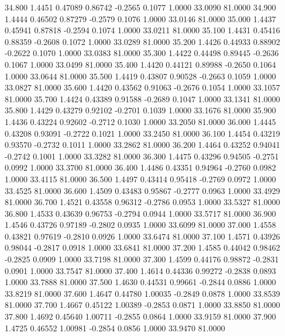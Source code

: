   34.800   1.4451   0.47089   0.86742  -0.2565   0.1077   1.0000  33.0090  81.0000
  34.900   1.4444   0.46502   0.87279  -0.2579   0.1076   1.0000  33.0146  81.0000
  35.000   1.4437   0.45941   0.87818  -0.2594   0.1074   1.0000  33.0211  81.0000
  35.100   1.4431   0.45416   0.88359  -0.2608   0.1072   1.0000  33.0289  81.0000
  35.200   1.4426   0.44933   0.88902  -0.2622   0.1070   1.0000  33.0383  81.0000
  35.300   1.4422   0.44498   0.89445  -0.2636   0.1067   1.0000  33.0499  81.0000
  35.400   1.4420   0.44121   0.89988  -0.2650   0.1064   1.0000  33.0644  81.0000
  35.500   1.4419   0.43807   0.90528  -0.2663   0.1059   1.0000  33.0827  81.0000
  35.600   1.4420   0.43562   0.91063  -0.2676   0.1054   1.0000  33.1057  81.0000
  35.700   1.4424   0.43389   0.91588  -0.2689   0.1047   1.0000  33.1341  81.0000
  35.800   1.4429   0.43279   0.92102  -0.2701   0.1039   1.0000  33.1676  81.0000
  35.900   1.4436   0.43224   0.92602  -0.2712   0.1030   1.0000  33.2050  81.0000
  36.000   1.4445   0.43208   0.93091  -0.2722   0.1021   1.0000  33.2450  81.0000
  36.100   1.4454   0.43219   0.93570  -0.2732   0.1011   1.0000  33.2862  81.0000
  36.200   1.4464   0.43252   0.94041  -0.2742   0.1001   1.0000  33.3282  81.0000
  36.300   1.4475   0.43296   0.94505  -0.2751   0.0992   1.0000  33.3700  81.0000
  36.400   1.4486   0.43351   0.94964  -0.2760   0.0982   1.0000  33.4115  81.0000
  36.500   1.4497   0.43414   0.95418  -0.2769   0.0972   1.0000  33.4525  81.0000
  36.600   1.4509   0.43483   0.95867  -0.2777   0.0963   1.0000  33.4929  81.0000
  36.700   1.4521   0.43558   0.96312  -0.2786   0.0953   1.0000  33.5327  81.0000
  36.800   1.4533   0.43639   0.96753  -0.2794   0.0944   1.0000  33.5717  81.0000
  36.900   1.4546   0.43726   0.97189  -0.2802   0.0935   1.0000  33.6099  81.0000
  37.000   1.4558   0.43821   0.97619  -0.2810   0.0926   1.0000  33.6474  81.0000
  37.100   1.4571   0.43926   0.98044  -0.2817   0.0918   1.0000  33.6841  81.0000
  37.200   1.4585   0.44042   0.98462  -0.2825   0.0909   1.0000  33.7198  81.0000
  37.300   1.4599   0.44176   0.98872  -0.2831   0.0901   1.0000  33.7547  81.0000
  37.400   1.4614   0.44336   0.99272  -0.2838   0.0893   1.0000  33.7888  81.0000
  37.500   1.4630   0.44531   0.99661  -0.2844   0.0886   1.0000  33.8219  81.0000
  37.600   1.4647   0.44780   1.00035  -0.2849   0.0878   1.0000  33.8539  81.0000
  37.700   1.4667   0.45122   1.00389  -0.2853   0.0871   1.0000  33.8850  81.0000
  37.800   1.4692   0.45640   1.00711  -0.2855   0.0864   1.0000  33.9159  81.0000
  37.900   1.4725   0.46552   1.00981  -0.2854   0.0856   1.0000  33.9470  81.0000
